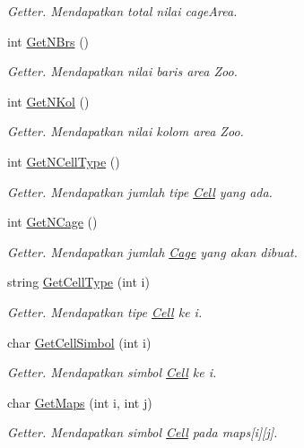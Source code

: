 \begin{DoxyCompactItemize}
\begin{DoxyCompactList}\small\item\em Getter. Mendapatkan total nilai cage\-Area. \end{DoxyCompactList}\item 
int \hyperlink{classFileReader_a546d60999827827b4cdccc8f943b813a}{Get\-N\-Brs} ()
\begin{DoxyCompactList}\small\item\em Getter. Mendapatkan nilai baris area Zoo. \end{DoxyCompactList}\item 
int \hyperlink{classFileReader_a5ac9938fe0188936d018da3be5f50376}{Get\-N\-Kol} ()
\begin{DoxyCompactList}\small\item\em Getter. Mendapatkan nilai kolom area Zoo. \end{DoxyCompactList}\item 
int \hyperlink{classFileReader_a20720a0ebdbbdbf78cfdfd204f513378}{Get\-N\-Cell\-Type} ()
\begin{DoxyCompactList}\small\item\em Getter. Mendapatkan jumlah tipe \hyperlink{classCell}{Cell} yang ada. \end{DoxyCompactList}\item 
int \hyperlink{classFileReader_acf0f6592e2d70ae0c30ecfd31b9542d8}{Get\-N\-Cage} ()
\begin{DoxyCompactList}\small\item\em Getter. Mendapatkan jumlah \hyperlink{classCage}{Cage} yang akan dibuat. \end{DoxyCompactList}\item 
string \hyperlink{classFileReader_a682b3ed91b920ba7fc0f6bf02ee2b7cb}{Get\-Cell\-Type} (int i)
\begin{DoxyCompactList}\small\item\em Getter. Mendapatkan tipe \hyperlink{classCell}{Cell} ke i. \end{DoxyCompactList}\item 
char \hyperlink{classFileReader_a658827df1193174f59ea615aee98e56b}{Get\-Cell\-Simbol} (int i)
\begin{DoxyCompactList}\small\item\em Getter. Mendapatkan simbol \hyperlink{classCell}{Cell} ke i. \end{DoxyCompactList}\item 
char \hyperlink{classFileReader_a1158227a3ca70debdec0b5a6d19a33af}{Get\-Maps} (int i, int j)
\begin{DoxyCompactList}\small\item\em Getter. Mendapatkan simbol \hyperlink{classCell}{Cell} pada maps\mbox{[}i\mbox{]}\mbox{[}j\mbox{]}. \end{DoxyCompactList}\item 

\end{DoxyCompactItemize}
